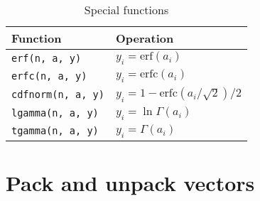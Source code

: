 \begin{table}
  \begin{tabularx}{\textwidth}{XX}
    \toprule
    Function & Operation \\
    \midrule
    \verb|erf(n, a, y)|     & $y_i = \mathrm{erf}(a_i)$                     \\
    \verb|erfc(n, a, y)|    & $y_i = \mathrm{erfc}(a_i)$                    \\
    \verb|cdfnorm(n, a, y)| & $y_i = 1 - \mathrm{erfc}(a_i / \sqrt{2}) / 2$ \\
    \verb|lgamma(n, a, y)|  & $y_i = \ln\Gamma(a_i)$                        \\
    \verb|tgamma(n, a, y)|  & $y_i = \Gamma(a_i)$                           \\
    \bottomrule
  \end{tabularx}
  \caption{Special functions}
  \label{tab:Special functions}
\end{table}

\section{Pack and unpack vectors}
\label{sec:Pack and unpack vectors}

